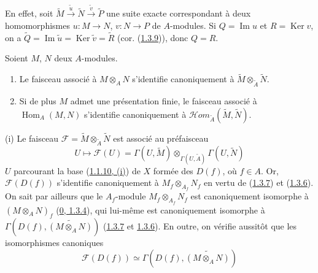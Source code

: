 En effet, soit
$\widetilde{M}\xrightarrow{\widetilde{u}}\widetilde{N}
\xrightarrow{\widetilde{v}}\widetilde{P}$ une suite exacte correspondant à
deux homomorphismes $u:M\to N$, $v:N\to P$ de $A$-modules. Si
$Q=\operatorname{Im}u$ et $R=\operatorname{Ker}v$, on a
$\widetilde{Q}=\operatorname{Im}\widetilde{u}
=\operatorname{Ker}\widetilde{v}=\widetilde{R}$
(cor. (\hyperref[I.1.3.9-fr]{1.3.9})), donc $Q=R$.

\begin{corollary}[1.3.12]
\label{I.1.3.12-fr}
Soient $M$, $N$ deux $A$-modules.
\begin{enumerate}
  \item[\rm(i)] Le faisceau associé à $M\otimes_A N$ s'identifie
  canoniquement à $\widetilde{M}\otimes_{\widetilde{A}}\widetilde{N}$.
  \item[\rm(ii)] Si de plus $M$ admet une présentation finie, le faisceau
  associé à $\operatorname{Hom}_A(M,N)$ s'identifie canoniquement à
  $\mathscr{H}\!om_{\widetilde{A}}(\widetilde{M},\widetilde{N})$.
\end{enumerate}
\end{corollary}

(i) Le faisceau
$\mathscr{F}=\widetilde{M}\otimes_{\widetilde{A}}\widetilde{N}$ est associé
au préfaisceau
\[
  U\mapsto\mathscr{F}(U)=\Gamma(U,\widetilde{M})
  \otimes_{\Gamma(U,\widetilde{A})}\Gamma(U,\widetilde{N})
\]
$U$ parcourant la base (\hyperref[I.1.1.10-fr]{1.1.10, (i)}) de $X$ formée
des $D(f)$, où $f\in A$. Or, $\mathscr{F}(D(f))$ s'identifie canoniquement à
$M_f\otimes_{A_f}N_f$ en vertu de (\hyperref[I.1.3.7-fr]{1.3.7}) et
(\hyperref[I.1.3.6-fr]{1.3.6}). On sait par ailleurs que le $A_f$-module
$M_f\otimes_{A_f}N_f$ est canoniquement isomorphe à $(M\otimes_A N)_f$
(\hyperref[0.1.3.4-fr]{0, 1.3.4}), qui lui-même est canoniquement isomorphe à
$\Gamma(D(f),\widetilde{(M\otimes_A N)})$
(\hyperref[I.1.3.7-fr]{1.3.7} et \hyperref[I.1.3.6-fr]{1.3.6}). En outre, on
vérifie aussitôt que les isomorphismes canoniques
\[
  \mathscr{F}(D(f))\simeq\Gamma(D(f),\widetilde{(M\otimes_A N)})
\]
